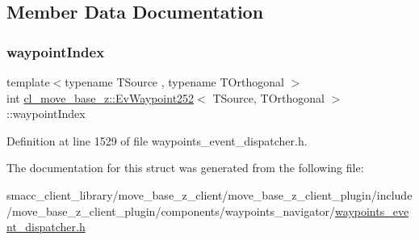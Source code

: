 \subsection{Member Data Documentation}
\mbox{\label{structcl__move__base__z_1_1EvWaypoint252_a84d3bb530b93b9f30c6b6ad00df0d916}} 
\subsubsection{\texorpdfstring{waypoint\+Index}{waypointIndex}}
{\footnotesize\ttfamily template$<$typename T\+Source , typename T\+Orthogonal $>$ \\
int \hyperlink{structcl__move__base__z_1_1EvWaypoint252}{cl\+\_\+move\+\_\+base\+\_\+z\+::\+Ev\+Waypoint252}$<$ T\+Source, T\+Orthogonal $>$\+::waypoint\+Index}



Definition at line 1529 of file waypoints\+\_\+event\+\_\+dispatcher.\+h.



The documentation for this struct was generated from the following file\+:\begin{DoxyCompactItemize}
\item 
smacc\+\_\+client\+\_\+library/move\+\_\+base\+\_\+z\+\_\+client/move\+\_\+base\+\_\+z\+\_\+client\+\_\+plugin/include/move\+\_\+base\+\_\+z\+\_\+client\+\_\+plugin/components/waypoints\+\_\+navigator/\hyperlink{waypoints__event__dispatcher_8h}{waypoints\+\_\+event\+\_\+dispatcher.\+h}\end{DoxyCompactItemize}
